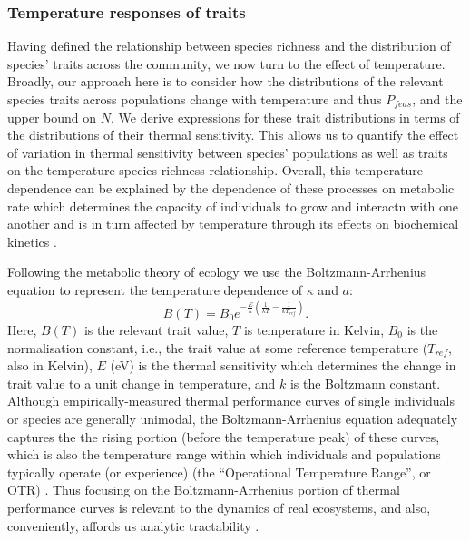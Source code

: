 \documentclass{article}
\begin{document}
\subsubsection*{Temperature responses of traits} \label{SEC:Temperature}
Having defined the relationship between species richness and the distribution of species' traits across the community, we now turn to the effect of temperature. Broadly, our approach here is to consider how the distributions of the relevant species traits across populations change with temperature and thus $P_{feas}$, and the upper bound on $N$. We derive expressions for these trait distributions in terms of the distributions of their thermal sensitivity. This allows us to quantify the effect of variation in thermal sensitivity between species' populations as well as traits on the temperature-species richness relationship. Overall, this temperature dependence can be explained by the dependence of these processes on metabolic rate which determines the capacity of individuals to grow and interactn with one another and is in turn affected by temperature through its effects on biochemical kinetics \cite{Gillooly2001,Brown2004}.

Following the metabolic theory of ecology \cite{Gillooly2001,Brown2004} we use the Boltzmann-Arrhenius equation to represent the temperature dependence of $\kappa$ and $a$:
\begin{equation} \label{EQ:Boltzmann}
    B(T) = B_0 e^{-\frac{E}{k} \left(\frac{1}{kT} - \frac{1}{k T_{ref} }\right)}.
\end{equation}
Here, $B(T)$ is the relevant trait value,  $T$ is temperature in Kelvin, $B_0$ is the normalisation constant, i.e., the trait value at some reference temperature ($T_{ref}$, also in Kelvin), $E$ (eV) is the thermal sensitivity which determines the change in trait value to a unit change in temperature, and $k$ is the Boltzmann constant. Although empirically-measured thermal performance curves of single individuals or species are generally unimodal, the Boltzmann-Arrhenius equation adequately captures the the rising portion (before the temperature peak) of these curves, which is also the temperature range within which individuals and populations typically operate (or experience) (the ``Operational Temperature Range'', or OTR) \cite{Dell2011}. Thus focusing on the Boltzmann-Arrhenius portion of thermal performance curves is relevant to the dynamics of real ecosystems, and also, conveniently, affords us analytic tractability . 
\end{document}

